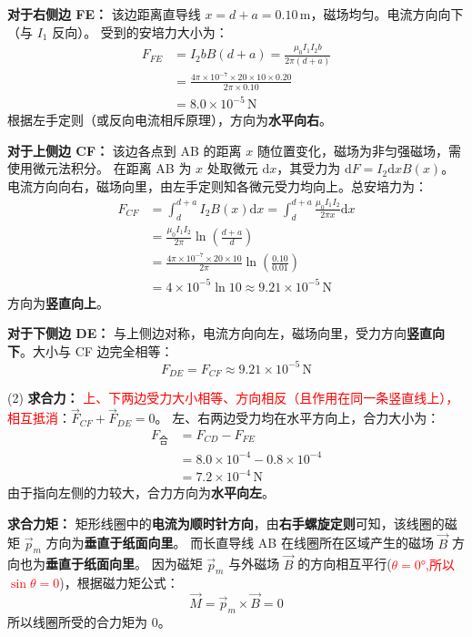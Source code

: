 \textbf{对于右侧边 FE：}
该边距离直导线 $x = d + a = 0.10\,\text{m}$，磁场均匀。电流方向向下（与 $I_1$ 反向）。
受到的安培力大小为：
\begin{align*}
	F_{FE} &= I_2 b B(d+a) = \frac{\mu_0 I_1 I_2 b}{2\pi (d+a)} \\
	&= \frac{4\pi \times 10^{-7} \times 20 \times 10 \times 0.20}{2\pi \times 0.10} \\
	&= 8.0 \times 10^{-5}\,\text{N}
\end{align*}
根据左手定则（或反向电流相斥原理），方向为\textbf{水平向右}。

\textbf{对于上侧边 CF：}
该边各点到 AB 的距离 $x$ 随位置变化，磁场为非匀强磁场，需使用微元法积分。
在距离 AB 为 $x$ 处取微元 $\mathrm{d}x$，其受力为 $\mathrm{d}F = I_2 \mathrm{d}x B(x)$。
电流方向向右，磁场向里，由左手定则知各微元受力均向上。总安培力为：
\begin{align*}
	F_{CF} &= \int_{d}^{d+a} I_2 B(x) \mathrm{d}x = \int_{d}^{d+a} \frac{\mu_0 I_1 I_2}{2\pi x} \mathrm{d}x \\
	&= \frac{\mu_0 I_1 I_2}{2\pi} \ln\left(\frac{d+a}{d}\right) \\
	&= \frac{4\pi \times 10^{-7} \times 20 \times 10}{2\pi} \ln\left(\frac{0.10}{0.01}\right) \\
	&= 4 \times 10^{-5} \ln 10 \approx 9.21 \times 10^{-5}\,\text{N}
\end{align*}
方向为\textbf{竖直向上}。

\textbf{对于下侧边 DE：}
与上侧边对称，电流方向向左，磁场向里，受力方向\textbf{竖直向下}。大小与 CF 边完全相等：
\begin{equation}\label{eq:9-20-2}
	F_{DE} = F_{CF} \approx 9.21 \times 10^{-5}\,\text{N}
\end{equation}

(2) \textbf{求合力：}
\textcolor{red}{上、下两边受力大小相等、方向相反（且作用在同一条竖直线上），相互抵消}：$\vec{F}_{CF} + \vec{F}_{DE} = 0$。
左、右两边受力均在水平方向上，合力大小为：
\begin{align*}
	F_{\text{合}} &= F_{CD} - F_{FE} \\
	&= 8.0 \times 10^{-4} - 0.8 \times 10^{-4} \\
	&= 7.2 \times 10^{-4}\,\text{N}
\end{align*}
由于指向左侧的力较大，合力方向为\textbf{水平向左}。

\textbf{求合力矩：}
矩形线圈中的\textbf{电流为顺时针方向}，由\textbf{右手螺旋定则}可知，该线圈的磁矩 $\vec{p}_m$ 方向为\textbf{垂直于纸面向里}。
而长直导线 AB 在线圈所在区域产生的磁场 $\vec{B}$ 方向也为\textbf{垂直于纸面向里}。
因为磁矩 $\vec{p}_m$ 与外磁场 $\vec{B}$ 的方向相互平行(\textcolor{red}{$\theta=0°$,所以$\sin\theta=0$})，根据磁力矩公式：
\begin{equation}\label{eq:9-20-3}
	\vec{M} = \vec{p}_m \times \vec{B} = 0
\end{equation}
所以线圈所受的合力矩为 $0$。


